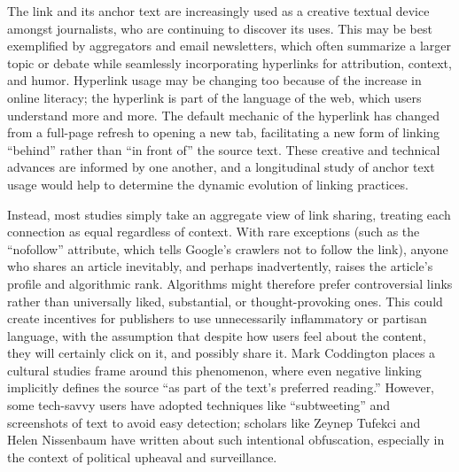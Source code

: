 The link and its anchor text are increasingly used as a creative textual device amongst journalists, who are continuing to discover its uses. This may be best exemplified by aggregators and email newsletters, which often summarize a larger topic or debate while seamlessly incorporating hyperlinks for attribution, context, and humor. Hyperlink usage may be changing too because of the increase in online literacy; the hyperlink is part of the language of the web, which users understand more and more. The default mechanic of the hyperlink has changed from a full-page refresh to opening a new tab, facilitating a new form of linking ``behind'' rather than ``in front of'' the source text. These creative and technical advances are informed by one another, and a longitudinal study of anchor text usage would help to determine the dynamic evolution of linking practices.

Instead, most studies simply take an aggregate view of link sharing, treating each connection as equal regardless of context. With rare exceptions (such as the ``nofollow'' attribute, which tells Google's crawlers not to follow the link), anyone who shares an article inevitably, and perhaps inadvertently, raises the article's profile and algorithmic rank. Algorithms might therefore prefer controversial links rather than universally liked, substantial, or thought-provoking ones. This could create incentives for publishers to use unnecessarily inflammatory or partisan language, with the assumption that despite how users feel about the content, they will certainly click on it, and possibly share it. Mark Coddington places a cultural studies frame around this phenomenon, where even negative linking implicitly defines the source ``as part of the text's preferred reading.''\autocite{coddington_building_2012} However, some tech-savvy users have adopted techniques like ``subtweeting'' and screenshots of text to avoid easy detection; scholars like Zeynep Tufekci and Helen Nissenbaum have written about such intentional obfuscation, especially in the context of political upheaval and surveillance.\autocites{tufekci_big_2014}{zuckerman_helen_2014}

